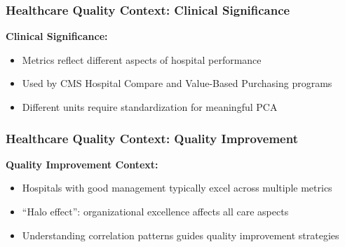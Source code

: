 \documentclass[aspectratio=169]{beamer}
\begin{document}
\begin{frame}
    \frametitle{Healthcare Quality Context: Clinical Significance}
    \textbf{Clinical Significance:}
    \begin{itemize}
        \item Metrics reflect different aspects of hospital performance \pause
        \item Used by CMS Hospital Compare and Value-Based Purchasing programs \pause
        \item Different units require standardization for meaningful PCA \pause
    \end{itemize}
\end{frame}

\begin{frame}
    \frametitle{Healthcare Quality Context: Quality Improvement}
    \textbf{Quality Improvement Context:}
    \begin{itemize}
        \item Hospitals with good management typically excel across multiple metrics \pause
        \item ``Halo effect'': organizational excellence affects all care aspects \pause
        \item Understanding correlation patterns guides quality improvement strategies \pause
    \end{itemize}
\end{frame}
\end{document}
